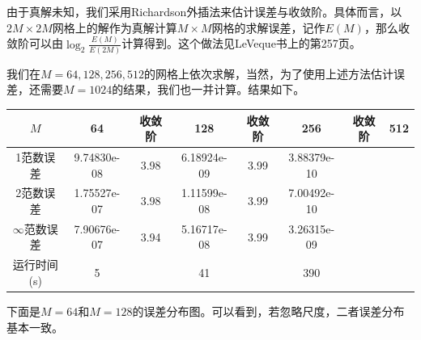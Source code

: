 \documentclass[lang=cn,10pt,bibend=bibtex]{elegantbook}
\begin{document}
由于真解未知，我们采用Richardson外插法来估计误差与收敛阶。具体而言，以$2M\times 2M$网格上的解作为真解计算$M\times M$网格的求解误差，记作$E(M)$，那么收敛阶可以由$\log_2\frac{E(M)}{E(2M)}$计算得到。这个做法见LeVeque书\cite{2007Finite}上的第257页。

我们在$M=64,128,256,512$的网格上依次求解，当然，为了使用上述方法估计误差，还需要$M=1024$的结果，我们也一并计算。结果如下。

\begin{table}[H]
  \centering
  \small
  \begin{tabular}{c|ccccccc}
  \textbf{$M$}              & 64          & 收敛阶 & 128         & 收敛阶 & 256         & 收敛阶 & 512   \\ \hline
  1范数误差                  & 9.74830e-08 & 3.98  & 6.18924e-09 & 3.99  & 3.88379e-10 &   &  \\
  2范数误差                  & 1.75527e-07 & 3.98  & 1.11599e-08 & 3.99  & 7.00492e-10 &   &  \\
  $\infty$范数误差           & 7.90676e-07 & 3.94  & 5.16717e-08 & 3.99  & 3.26315e-09 &   &  \\
  运行时间(s)                & 5           &       & 41          &       & 390         &       & 
  \end{tabular}
\end{table}

下面是$M=64$和$M=128$的误差分布图。可以看到，若忽略尺度，二者误差分布基本一致。
\end{document}
